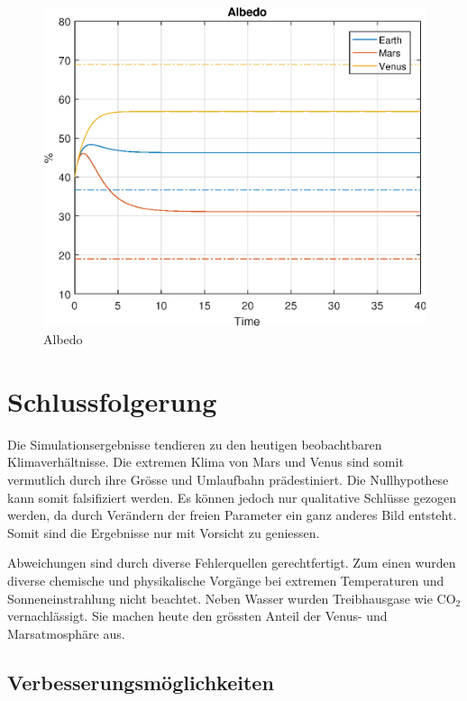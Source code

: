 \begin{refsection}
		\begin{figure}
			\center
			\includegraphics[height=0.45\textheight]{planeten/Matlab/figures/albedo.eps}
			\caption{Albedo}
		\end{figure}

\section{Schlussfolgerung}

Die Simulationsergebnisse tendieren zu den heutigen beobachtbaren Klimaverhältnisse. Die extremen Klima von Mars und Venus sind somit vermutlich durch ihre Grösse und Umlaufbahn prädestiniert. Die Nullhypothese kann somit falsifiziert werden. Es können jedoch nur qualitative Schlüsse gezogen werden, da durch Verändern der freien Parameter ein ganz anderes Bild entsteht. Somit sind die Ergebnisse nur mit Vorsicht zu geniessen.

Abweichungen sind durch diverse Fehlerquellen gerechtfertigt. Zum einen wurden diverse chemische und physikalische Vorgänge bei extremen Temperaturen und Sonneneinstrahlung nicht beachtet.
Neben Wasser wurden Treibhausgase wie CO$_2$ vernachlässigt. Sie machen heute den grössten Anteil der Venus- und Marsatmosphäre aus.

\subsection{Verbesserungsmöglichkeiten}


\end{refsection}
